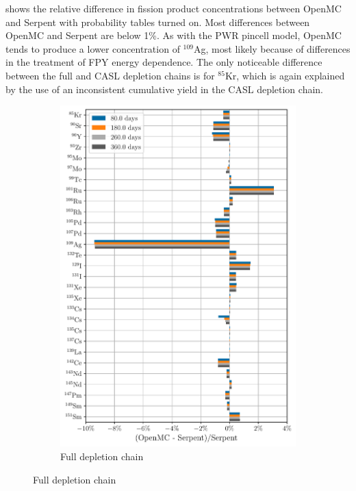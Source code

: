 \documentclass[3p,authoryear]{elsarticle}
\begin{document}
 shows the relative difference in fission product
concentrations between OpenMC and Serpent with probability tables turned on.
Most differences between OpenMC and Serpent are below 1\%. As with the PWR
pincell model, OpenMC tends to produce a lower concentration of $^{109}$Ag, most
likely because of differences in the treatment of FPY energy dependence. The
only noticeable difference between the full and CASL depletion chains is for
$^{85}$Kr, which is again explained by the use of an inconsistent cumulative
yield in the CASL depletion chain.
\begin{figure}[H]
  \centering
  \begin{subfigure}[t]{0.45\textwidth}
    \includegraphics[width=\textwidth]{figures/sfr_fp_full_average.pdf}
    \caption{Full depletion chain}
  \end{subfigure}

\end{figure}
\end{document}
